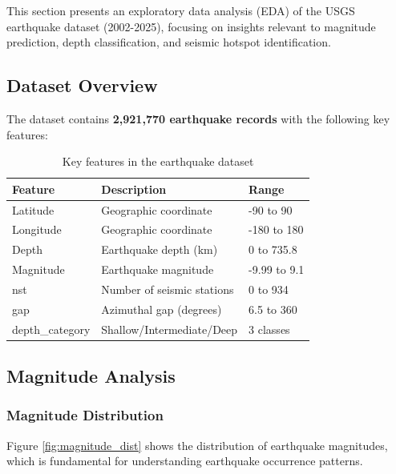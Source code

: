 
This section presents an exploratory data analysis (EDA) of the USGS earthquake dataset (2002-2025), focusing on insights relevant to magnitude prediction, depth classification, and seismic hotspot identification.

\subsection{Dataset Overview}

The dataset contains \textbf{2,921,770 earthquake records} with the following key features:

\begin{table}[H]
\centering
\begin{tabular}{|l|l|l|}
\hline
\textbf{Feature} & \textbf{Description} & \textbf{Range} \\
\hline
Latitude & Geographic coordinate & -90 to 90 \\
Longitude & Geographic coordinate & -180 to 180 \\
Depth & Earthquake depth (km) & 0 to 735.8 \\
Magnitude & Earthquake magnitude & -9.99 to 9.1 \\
nst & Number of seismic stations & 0 to 934 \\
gap & Azimuthal gap (degrees) & 6.5 to 360 \\
depth\_category & Shallow/Intermediate/Deep & 3 classes \\
\hline
\end{tabular}
\caption{Key features in the earthquake dataset}
\end{table}

\subsection{Magnitude Analysis}

\subsubsection{Magnitude Distribution}

Figure \ref{fig:magnitude_dist} shows the distribution of earthquake magnitudes, which is fundamental for understanding earthquake occurrence patterns.

